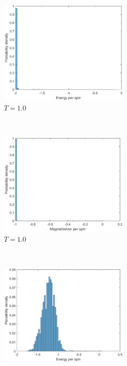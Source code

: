 \begin{figure}[tb]
	\begin{subfigure}[tb]{0.5\textwidth}
		\centering
		\includegraphics[width=0.7\textwidth]{Prob_ene_lowT.eps}
		\caption{$T=1.0$}
	\end{subfigure}
	~
	\begin{subfigure}[tb]{0.5\textwidth}
		\centering
		\includegraphics[width=0.7\textwidth]{Prob_mag_lowT.eps}		
		\caption{$T=1.0$}
	\end{subfigure}
	~
	\begin{subfigure}[tb]{0.5\textwidth}
		\centering
		\includegraphics[width=0.7\textwidth]{Prob_ene_highT.eps}		

\end{subfigure}
\end{figure}

